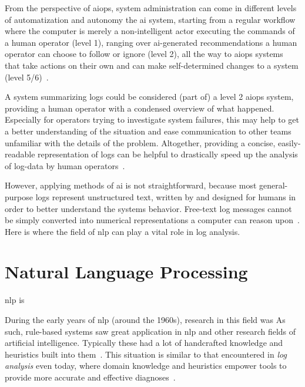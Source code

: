 From the perspective of \ac{aiops},
system administration can come in different levels of automatization and autonomy the \ac{ai} system,
starting from a regular workflow where the computer is merely a non-intelligent actor executing the commands of a human operator (level 1),
ranging over \ac{ai}-generated recommendations a human operator can choose to follow or ignore (level 2),
all the way to \ac{aiops} systems that take actions on their own and can make self-determined changes to a system (level 5/6)~\parencite[5]{aiops_levels}.

A system summarizing logs could be considered (part of) a level 2 \ac{aiops} system,
providing a human operator with a condensed overview of what happened.
Especially for operators trying to investigate system failures,
this may help to get a better understanding of the situation
and ease communication to other teams unfamiliar with the details of the problem.
Altogether, providing a concise, easily-readable representation of logs can be helpful
to drastically speed up the analysis of log-data by human operators~\parencite[11-12]{logassist}.

However, applying methods of \acl{ai} is not straightforward,
because most general-purpose logs represent unstructured text,
written by and designed for humans in order to better understand the systems behavior.
Free-text log messages cannot be simply converted into
numerical representations a computer can reason upon~\parencite[57,60]{log_analysis}.\\
Here is where the field of \acs*{nlp} can play a vital role in log analysis.

\section{Natural Language Processing}


\Ac{nlp} is 

During the early years of \ac{nlp} (around the 1960s),
research in this field was
As such, rule-based systems saw great application in \ac{nlp} and other research fields of artificial intelligence.
Typically these had a lot of handcrafted knowledge and heuristics built into them~\parencites[5]{statistical_nlp}[14]{practical_nlp}.
This situation is similar to that encountered in \emph{log analysis} even today,
where domain knowledge and heuristics empower tools to provide more accurate and effective diagnoses~\parencite[57]{log_analysis}.

